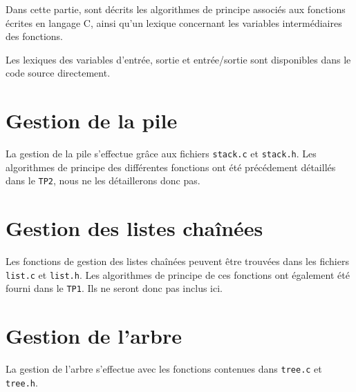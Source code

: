 Dans cette partie, sont décrits les algorithmes de principe associés aux fonctions écrites en langage C, ainsi qu'un lexique concernant les variables intermédiaires des fonctions.

Les lexiques des variables d'entrée, sortie et entrée/sortie sont disponibles dans le code source directement.

\section{Gestion de la pile}
  La gestion de la pile s'effectue grâce aux fichiers \texttt{stack.c} et \texttt{stack.h}.
  Les algorithmes de principe des différentes fonctions ont été précédement détaillés dans le \texttt{TP2}, nous ne les détaillerons donc pas.

\section{Gestion des listes chaînées}
  Les fonctions de gestion des listes chaînées peuvent être trouvées dans les fichiers \texttt{list.c} et \texttt{list.h}.
  Les algorithmes de principe de ces fonctions ont également été fourni dans le \texttt{TP1}. Ils ne seront donc pas inclus ici.

\section{Gestion de l'arbre}
  La gestion de l'arbre s'effectue avec les fonctions contenues dans \texttt{tree.c} et \texttt{tree.h}.
    
  \newpage
